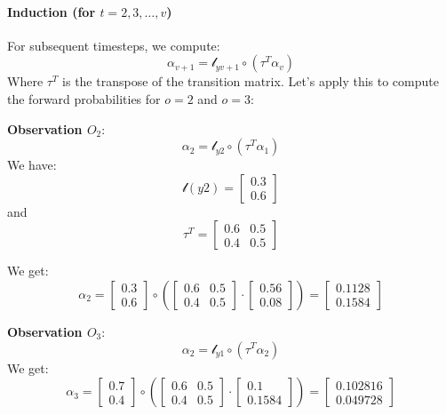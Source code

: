 \paragraph{Induction (for \( t = 2, 3, \dots, v \))}

  For subsequent timesteps, we compute:
  \[
  \alpha_{v+1} = \mathcal{l}_{yv+1} \circ  (\tau^T \alpha_v)
  \]
  Where \( \tau^T \) is the transpose of the transition matrix. Let’s apply this to compute the forward probabilities for \( o = 2 \) and \( o = 3 \):

  \textbf{Observation \( O_2 \)}:
  \[
  \alpha_2 = \mathcal{l}_{y2} \circ (\tau^T \alpha_1)
  \]
  We have:
  \[
  \mathcal{l}(y2) = \begin{bmatrix} 0.3 \\ 0.6 \end{bmatrix}
  \]
  and 
  \[
  \tau^T = \begin{bmatrix} 0.6 & 0.5 \\ 0.4 & 0.5 \end{bmatrix} 
  \]

  We get:
  \[
  \alpha_2 = \begin{bmatrix} 0.3 \\ 0.6 \end{bmatrix} \circ \left(\begin{bmatrix} 0.6 & 0.5 \\ 0.4 & 0.5 \end{bmatrix} \cdot \begin{bmatrix} 0.56 \\ 0.08 \end{bmatrix}\right) = \begin{bmatrix} 0.1128 \\ 0.1584 \end{bmatrix}
  \]

  \textbf{Observation \( O_3 \)}:
  \[
  \alpha_2 = \mathcal{l}_{y1} \circ (\tau^T \alpha_2)
  \]
  We get: 
  \[
  \alpha_3 = \begin{bmatrix} 0.7 \\ 0.4 \end{bmatrix} \circ \left( \begin{bmatrix} 0.6 & 0.5 \\ 0.4 & 0.5 \end{bmatrix} \cdot \begin{bmatrix} 0.1 \\ 0.1584 \end{bmatrix} \right)= \begin{bmatrix} 0.102816 \\ 0.049728 \end{bmatrix}
  \]

